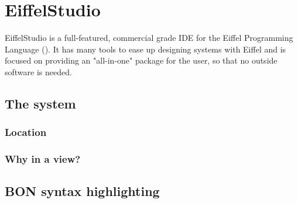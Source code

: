 \section{EiffelStudio}
EiffelStudio is a full-featured, commercial grade IDE for the Eiffel Programming Language (\cite[Quote from Origo website]{eiffel2006}). It has many tools to ease up designing systems with Eiffel and is focused on providing an "all-in-one" package for the user, so that no outside software is needed.

\subsection{The system}

\subsubsection{Location}

\subsubsection{Why in a view?}

\subsection{BON syntax highlighting}